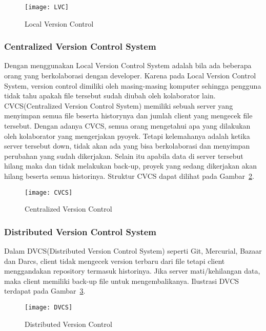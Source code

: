 \begin{figure}[H]
	\centering  
	\texttt{[image: LVC]}  
	\caption[Local Version Control]{Local Version Control}
	\label{fig:LVC} 
\end{figure}

\subsubsection{Centralized Version Control System}
Dengan menggunakan Local Version Control System adalah bila ada beberapa orang yang berkolaborasi dengan developer. Karena pada Local Version Control System, version control dimiliki oleh masing-masing komputer sehingga pengguna tidak tahu apakah file tersebut sudah diubah oleh kolaborator lain. CVCS(Centralized Version Control System) memiliki sebuah server yang menyimpan semua file beserta historynya dan jumlah client yang mengecek file tersebut. Dengan adanya CVCS, semua orang mengetahui apa yang dilakukan oleh kolaborator yang mengerjakan pyoyek. Tetapi kelemahanya adalah ketika server tersebut down, tidak akan ada yang bisa berkolaborasi dan menyimpan perubahan yang sudah dikerjakan. Selain itu apabila data di server tersebut hilang maka dan tidak melakukan back-up, proyek yang sedang dikerjakan akan hilang beserta semua historinya. Struktur CVCS dapat dilihat pada Gambar~\ref{fig:CVCS}.

\begin{figure}[H]
	\centering  
	\texttt{[image: CVCS]}  
	\caption[Centralized Version Control]{Centralized Version Control}
	\label{fig:CVCS} 
\end{figure}

\subsubsection{Distributed Version Control System}
Dalam DVCS(Distributed Version Control System) seperti Git, Mercurial, Bazaar dan Darcs, client tidak mengecek version terbaru dari file tetapi client menggandakan repository termasuk historinya. Jika server mati/kehilangan data, maka client memiliki back-up file untuk mengembalikanya.  Ilustrasi DVCS terdapat pada Gambar~\ref{fig:DVCS}.

\begin{figure}[H]
	\centering  
	\texttt{[image: DVCS]}  
	\caption[Distributed Version Control]{Distributed Version Control}
	\label{fig:DVCS} 
\end{figure}

